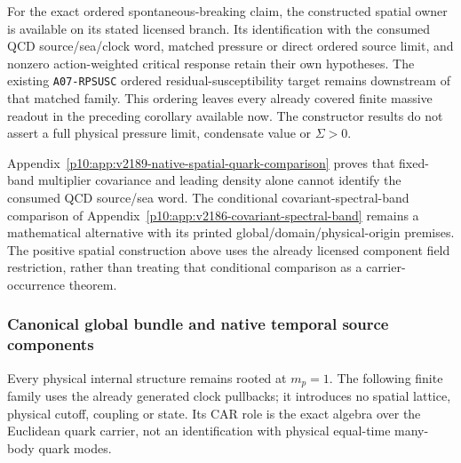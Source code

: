 \documentclass[12pt,a4paper]{article}
\begin{document}
For the exact ordered spontaneous-breaking claim, the constructed spatial
owner is available on its stated licensed branch. Its identification with
the consumed QCD source/sea/clock word, matched pressure or direct ordered
source limit, and nonzero action-weighted critical response retain their
own hypotheses. The existing \texttt{A07-RPSUSC} ordered
residual-susceptibility target remains downstream of that matched family.
This ordering leaves every already covered finite massive readout in the
preceding corollary available now. The constructor results do not assert a
full physical pressure limit, condensate value or $\Sigma>0$.

Appendix~\ref{p10:app:v2189-native-spatial-quark-comparison} proves that
fixed-band multiplier covariance and leading density alone cannot identify
the consumed QCD source/sea word. The conditional covariant-spectral-band
comparison of Appendix~\ref{p10:app:v2186-covariant-spectral-band} remains
a mathematical alternative with its printed global/domain/physical-origin
premises. The positive spatial construction above uses the already licensed
component field restriction, rather than treating that conditional
comparison as a carrier-occurrence theorem.




\subsubsection{Canonical global bundle and native temporal source components}
\label{p10:sec:v2189-native-clock-source-component}

Every physical internal structure remains rooted at $m_p=1$.
The following finite family uses the already generated clock pullbacks;
it introduces no spatial lattice, physical cutoff, coupling or state.
Its CAR role is the exact algebra over the Euclidean quark carrier,
not an identification with physical equal-time many-body quark modes.
\end{document}
